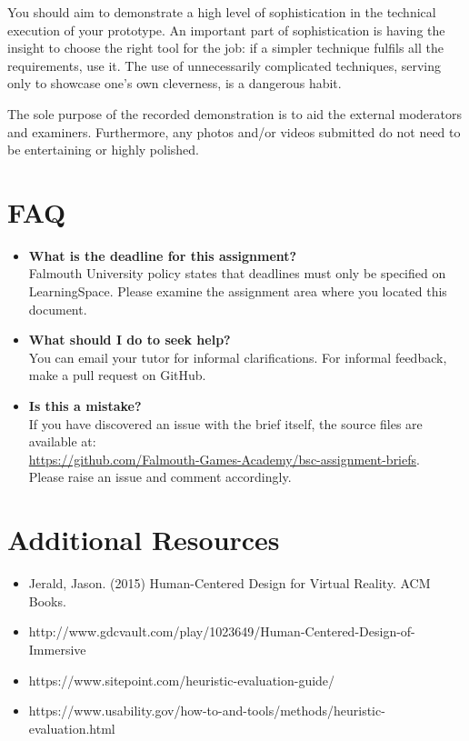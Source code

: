 \documentclass{../fal_assignment}
\begin{document}
You should aim to demonstrate a high level of sophistication in the technical execution of your prototype. An important part of sophistication is having the insight to choose the right tool for the job: if a simpler technique fulfils all the requirements, use it. The use of unnecessarily complicated techniques, serving only to showcase one's own cleverness, is a dangerous habit. 

The sole purpose of the recorded demonstration is to aid the external moderators and examiners. Furthermore, any photos and/or videos submitted do not need to be entertaining or highly polished.

\section*{FAQ}

\begin{itemize}
	\item 	\textbf{What is the deadline for this assignment?} \\ 
    		Falmouth University policy states that deadlines must only be specified on LearningSpace. Please examine the assignment area where you located this document.
    		
	\item 	\textbf{What should I do to seek help?} \\ 
    		You can email your tutor for informal clarifications. For informal feedback, make a pull request on GitHub. 
    		
    	\item 	\textbf{Is this a mistake?} \\ 	
    		If you have discovered an issue with the brief itself, the source files are available at: \\
    		\url{https://github.com/Falmouth-Games-Academy/bsc-assignment-briefs}.\\
    		 Please raise an issue and comment accordingly.
\end{itemize}

\section*{Additional Resources}

\begin{itemize}
     \item Jerald, Jason. (2015) Human-Centered Design for Virtual Reality. ACM Books.
    \item http://www.gdcvault.com/play/1023649/Human-Centered-Design-of-Immersive 
    \item https://www.sitepoint.com/heuristic-evaluation-guide/
    \item https://www.usability.gov/how-to-and-tools/methods/heuristic-evaluation.html
    
\end{itemize}
\end{document}
